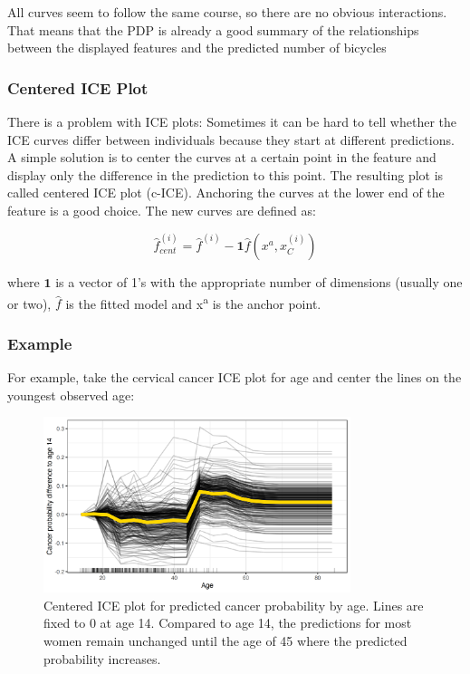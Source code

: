 \documentclass[
  10pt,
]{scrbook}
\begin{document}
All curves seem to follow the same course, so there are no obvious interactions.
That means that the PDP is already a good summary of the relationships between the displayed features and the predicted number of bicycles

\hypertarget{centered-ice-plot}{%
\subsubsection{Centered ICE Plot}\label{centered-ice-plot}}

There is a problem with ICE plots:
Sometimes it can be hard to tell whether the ICE curves differ between individuals because they start at different predictions.
A simple solution is to center the curves at a certain point in the feature and display only the difference in the prediction to this point.
The resulting plot is called centered ICE plot (c-ICE).
Anchoring the curves at the lower end of the feature is a good choice.
The new curves are defined as:

\[\hat{f}_{cent}^{(i)}=\hat{f}^{(i)}-\mathbf{1}\hat{f}(x^{a},x^{(i)}_{C})\]

where \(\mathbf{1}\) is a vector of 1's with the appropriate number of dimensions (usually one or two), \(\hat{f}\) is the fitted model and x\textsuperscript{a} is the anchor point.

\hypertarget{example-4}{%
\subsubsection{Example}\label{example-4}}

For example, take the cervical cancer ICE plot for age and center the lines on the youngest observed age:

\begin{figure}

{\centering \includegraphics[width=0.8\textwidth]{images/ice-cervical-centered-1} 

}

\caption{Centered ICE plot for predicted  cancer probability by age. Lines are fixed to 0 at age 14. Compared to age 14, the predictions for most women remain unchanged until the age of 45 where the predicted probability increases.}\label{fig:ice-cervical-centered}
\end{figure}
\end{document}
